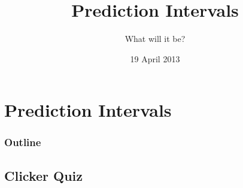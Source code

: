 
\section{Prediction Intervals}

\title{Prediction Intervals}
\subtitle{What will it be?}

\date{19 April 2013}

\begin{frame}
  \titlepage
\end{frame}

\begin{frame}
  \frametitle{Outline}
  \tableofcontents[pausesection,hideothersubsections,sectionstyle=show/hide]
\end{frame}


\subsection{Clicker Quiz}


